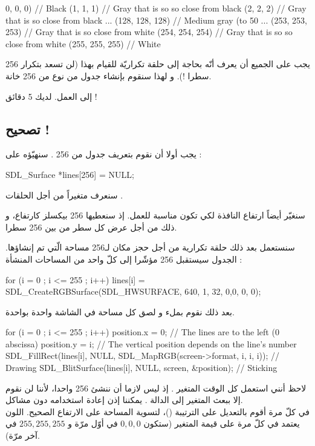 \begin{Csource}
0, 0, 0) // Black
(1, 1, 1) // Gray that is so so close from black
(2, 2, 2) // Gray that is so close from black
...
(128, 128, 128) // Medium gray (to 50 %
...
(253, 253, 253) // Gray that is so  close from white
(254, 254, 254) // Gray that is so so close from white
(255, 255, 255) // White
\end{Csource}

يجب على الجميع أن يعرف أنّه بحاجة إلى حلقة تكراريّة للقيام بهذا (لن تسعد بتكرار 256 سطرا !). و لهذا سنقوم بإنشاء جدول من نوع 
من 256 خانة.

إلى العمل. لديك 5 دقائق !

\subsection{تصحيح !}
 
يجب أولا أن نقوم بتعريف جدول من 256
.
سنهيّؤه على
 :

\begin{Csource}
SDL_Surface *lines[256] = {NULL};
\end{Csource}

سنعرف متغيراً
من أجل الحلقات 
.

سنغيّر أيضاً ارتفاع النافذة لكي تكون مناسبة للعمل. إذ سنعطيها 256 بيكسلز كارتفاع، و ذلك من أجل عرض كل سطر من بين 256 سطرا.

سنستعمل بعد ذلك حلقة تكرارية
من أجل حجز مكان لـ256 مساحة الّتي تم إنشاؤها. الجدول سيستقبل 256 مؤشّرا إلى كلّ واحد من المساحات المنشأة :

\begin{Csource}
for (i = 0 ; i <= 255 ; i++)
	lines[i] = SDL_CreateRGBSurface(SDL_HWSURFACE, 640, 1, 32, 0,0, 0, 0);
\end{Csource}

بعد ذلك نقوم بملء و لصق كل مساحة في الشاشة واحدة بواحدة.

\begin{Csource}
for (i = 0 ; i <= 255 ; i++)
{
	position.x = 0; // The lines are to the left (0 abscissa)
	position.y = i; // The vertical position depends on the line's number
	SDL_FillRect(lines[i], NULL, SDL_MapRGB(screen->format, i, i, i)); // Drawing
	SDL_BlitSurface(lines[i], NULL, screen, &position); // Sticking
}
\end{Csource}

 لاحظ أنني استعمل كل الوقت المتغير 
.
إذ ليس لازما أن ننشئ 256 واحدا، لأننا لن نقوم إلا ببعث المتغير إلى الدالة 
.
يمكننا إذن إعادة استخدامه دون مشاكل.\\
في كلّ مرة أقوم بالتعديل على الترتيبة
()،
لتسوية المساحة على الارتفاع الصحيح. اللون يعتمد في كلّ مرة على قيمة المتغير
(ستكون
$0, 0, 0$
في أوّل مرّة و $255, 255, 255$ في آخر مرّة).

